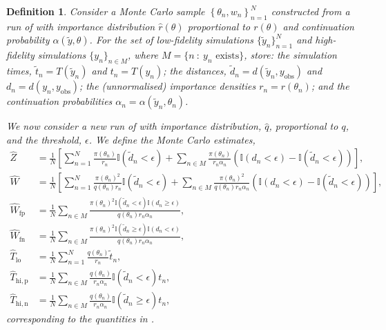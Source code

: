 \documentclass[12pt, onecolumn]{article}
\newcommand{\obs}[1]{#1_{\mathrm{obs}}}
\newcommand{\fp}[1]{#1_{\mathrm{fp}}}
\newcommand{\fn}[1]{#1_{\mathrm{fn}}}
\newtheorem{definition}[theorem]{Definition}
\begin{document}
\begin{definition}
\label{def:MonteCarlo}
Consider a Monte Carlo sample $\left\{ \theta_n, w_n \right\}_{n=1}^{N}$ constructed from a run of  with importance distribution $\hat r(\theta)$ proportional to $r(\theta)$ and continuation probability $\alpha(\tilde y, \theta)$.
For the set of low-fidelity simulations $\{ \tilde y_n \}_{n=1}^{N}$ and high-fidelity simulations $\{ y_n \}_{n \in M}$, where $M = \{ n~:~ y_n \text{ exists} \}$, store: the simulation times, $\tilde t_n = T(\tilde y_n)$ and $t_n = T(y_n)$; the distances, $\tilde d_n = d(\tilde y_n, \obs y)$ and $d_n = d(y_n, \obs y)$; the (unnormalised) importance densities $r_n = r(\theta_n)$; and the continuation probabilities $\alpha_n = \alpha(\tilde y_n, \theta_n)$.

We now consider a new run of  with importance distribution, $\hat q$, proportional to $q$, and the threshold, $\epsilon$.
We define the Monte Carlo estimates,
\begin{subequations}
\label{eq:MonteCarlo}
\begin{align}
 \hat Z &= \frac{1}{N} \left[ \sum_{n=1}^N \frac{\pi(\theta_n)}{r_n} \mathbb I(\tilde d_n < \epsilon) + \sum_{n \in M} \frac{\pi(\theta_n)}{r_n \alpha_n} \left( \mathbb I(d_n < \epsilon) - \mathbb I(\tilde d_n < \epsilon)\right) \right]
 \label{eq:Zhat}
, \\
 \hat{W} &= \frac{1}{N} \left[ \sum_{n=1}^N \frac{\pi(\theta_n)^2}{q(\theta_n) r_n} \mathbb I(\tilde d_n < \epsilon) + \sum_{n \in M} \frac{\pi(\theta_n)^2}{q(\theta_n) r_n \alpha_n} \left( \mathbb I(d_n < \epsilon) - \mathbb I(\tilde d_n < \epsilon)\right) \right]
 \label{eq:MC_tpfn}
, \\ \fp{\hat{W}} &= \frac{1}{N} \sum_{n \in M} \frac{ \pi(\theta_n)^2  \mathbb I (\tilde d_n < \epsilon) \mathbb I (d_n \geq \epsilon)}{q(\theta_n) r_n \alpha_n}
 \label{eq:MC_fp}
, \\ \fn{\hat{W}} &= \frac{1}{N} \sum_{n \in M} \frac{ \pi(\theta_n)^2 \mathbb I (\tilde d_n \geq \epsilon) \mathbb I (d_n < \epsilon)}{q(\theta_n) r_n \alpha _n} 
 \label{eq:MC_fn}
, \\ \hat T_{\mathrm{lo}} &= \frac{1}{N} \sum_{n=1}^{N} \frac{q(\theta_n)}{r_n} \tilde t_n
 \label{eq:T_lo}
, \\ \hat T_{\mathrm{hi}, \mathrm p} &= \frac{1}{N} \sum_{n \in M} \frac{q(\theta_n)}{r_n \alpha_n} \mathbb I(\tilde d_n < \epsilon) t_n
 \label{eq:T_hi_p}
, \\ \hat T_{\mathrm{hi}, \mathrm n} &= \frac{1}{N} \sum_{n \in M} \frac{q(\theta_n)}{r_n \alpha_n} \mathbb I(\tilde d_n \geq \epsilon) t_n
 \label{eq:T_hi_n}
,
\end{align}
\end{subequations}
corresponding to the quantities in .
\end{definition}
\end{document}
